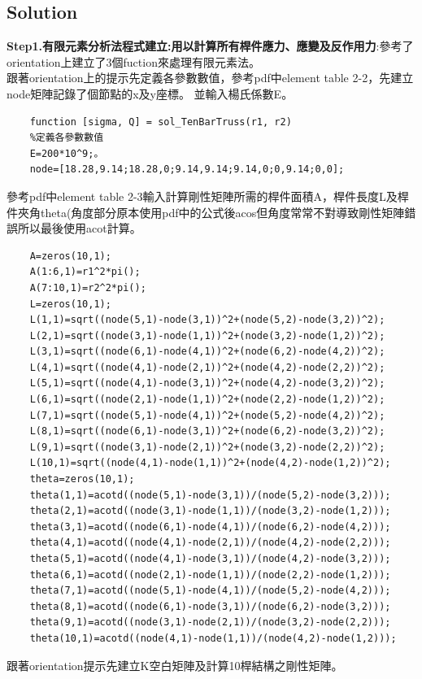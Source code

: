 \documentclass[12pt]{article}
\begin{document}
\begin{CJK}{UTF8}{bkai}
\subsection*{Solution}

\textbf{Step1.有限元素分析法程式建立:用以計算所有桿件應力、應變及反作用力}:參考了orientation上建立了3個fuction來處理有限元素法。\\


跟著orientation上的提示先定義各參數數值，參考pdf中element table 2-2，先建立node矩陣記錄了個節點的x及y座標。
並輸入楊氏係數E。
\begin{lstlisting}
	function [sigma, Q] = sol_TenBarTruss(r1, r2)
	%定義各參數數值
	E=200*10^9;。
    node=[18.28,9.14;18.28,0;9.14,9.14;9.14,0;0,9.14;0,0];
\end{lstlisting}
參考pdf中element table 2-3輸入計算剛性矩陣所需的桿件面積A，桿件長度L及桿件夾角theta(角度部分原本使用pdf中的公式後acos但角度常常不對導致剛性矩陣錯誤所以最後使用acot計算。
\begin{lstlisting}
    A=zeros(10,1);
    A(1:6,1)=r1^2*pi();
    A(7:10,1)=r2^2*pi();
    L=zeros(10,1);
    L(1,1)=sqrt((node(5,1)-node(3,1))^2+(node(5,2)-node(3,2))^2);
    L(2,1)=sqrt((node(3,1)-node(1,1))^2+(node(3,2)-node(1,2))^2);
    L(3,1)=sqrt((node(6,1)-node(4,1))^2+(node(6,2)-node(4,2))^2); 
    L(4,1)=sqrt((node(4,1)-node(2,1))^2+(node(4,2)-node(2,2))^2);
    L(5,1)=sqrt((node(4,1)-node(3,1))^2+(node(4,2)-node(3,2))^2);
    L(6,1)=sqrt((node(2,1)-node(1,1))^2+(node(2,2)-node(1,2))^2);
    L(7,1)=sqrt((node(5,1)-node(4,1))^2+(node(5,2)-node(4,2))^2);
    L(8,1)=sqrt((node(6,1)-node(3,1))^2+(node(6,2)-node(3,2))^2);
    L(9,1)=sqrt((node(3,1)-node(2,1))^2+(node(3,2)-node(2,2))^2);
    L(10,1)=sqrt((node(4,1)-node(1,1))^2+(node(4,2)-node(1,2))^2);
    theta=zeros(10,1);
    theta(1,1)=acotd((node(5,1)-node(3,1))/(node(5,2)-node(3,2)));
    theta(2,1)=acotd((node(3,1)-node(1,1))/(node(3,2)-node(1,2)));
    theta(3,1)=acotd((node(6,1)-node(4,1))/(node(6,2)-node(4,2)));
    theta(4,1)=acotd((node(4,1)-node(2,1))/(node(4,2)-node(2,2)));
    theta(5,1)=acotd((node(4,1)-node(3,1))/(node(4,2)-node(3,2)));
    theta(6,1)=acotd((node(2,1)-node(1,1))/(node(2,2)-node(1,2)));
    theta(7,1)=acotd((node(5,1)-node(4,1))/(node(5,2)-node(4,2)));
    theta(8,1)=acotd((node(6,1)-node(3,1))/(node(6,2)-node(3,2)));
    theta(9,1)=acotd((node(3,1)-node(2,1))/(node(3,2)-node(2,2)));
    theta(10,1)=acotd((node(4,1)-node(1,1))/(node(4,2)-node(1,2)));
\end{lstlisting}
跟著orientation提示先建立K空白矩陣及計算10桿結構之剛性矩陣。

\end{CJK}
\end{document}
